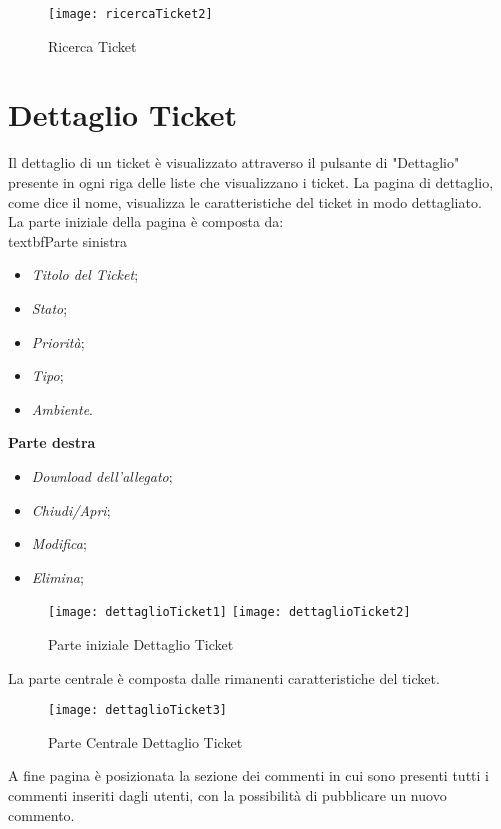 \begin{figure}[H]
\bigskip
     \texttt{[image: ricercaTicket2]} 
    \caption{Ricerca Ticket}
\end{figure}

\bigskip
\section{Dettaglio Ticket}
Il dettaglio di un ticket è visualizzato attraverso il pulsante di "Dettaglio" presente in ogni riga delle liste che visualizzano i ticket. La pagina di dettaglio, come dice il nome, visualizza le caratteristiche del ticket in modo dettagliato. \\ 
La parte iniziale della pagina è composta da:\
\medskip
\\textbf{Parte sinistra}
\begin{itemize}
\item \textit{Titolo del Ticket};
\item \textit{Stato};
\item \textit{Priorità};
\item \textit{Tipo};
\item \textit{Ambiente}.
\end{itemize}

\medskip
\noindent
\textbf{Parte destra}
\begin{itemize}
\item \textit{Download dell'allegato};
\item \textit{Chiudi/Apri};
\item \textit{Modifica};
\item \textit{Elimina};
\end{itemize}
\bigskip
\bigskip
\begin{figure}[H]
	\centering
	    \texttt{[image: dettaglioTicket1]} 
     \texttt{[image: dettaglioTicket2]} 
    \caption{Parte iniziale Dettaglio Ticket}
\end{figure}


\noindent
La parte centrale è composta dalle rimanenti caratteristiche del ticket.\\
\bigskip
\begin{figure}[H]
	\centering
    \texttt{[image: dettaglioTicket3]} 
\caption{Parte Centrale Dettaglio Ticket}
\end{figure}

\noindent
A fine pagina è posizionata la sezione dei commenti in cui sono presenti tutti i commenti inseriti dagli utenti, con la possibilità di pubblicare un nuovo commento. 

